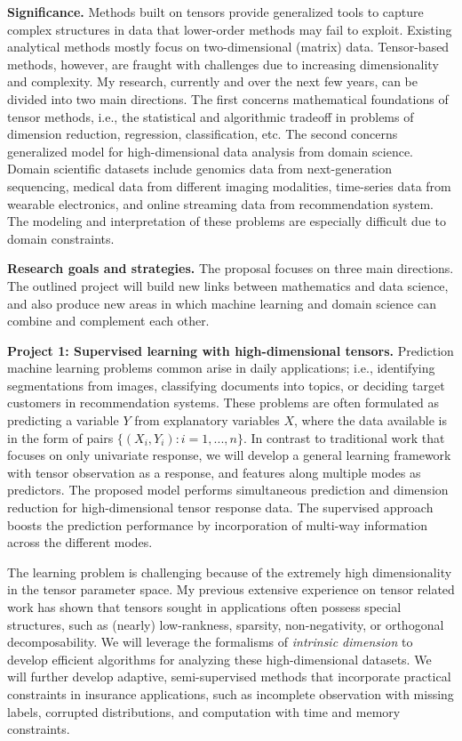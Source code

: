 \documentclass[11pt]{article}
\theoremstyle{plain}
\theoremstyle{definition}
\begin{document}
{\bf Significance.} Methods built on tensors provide generalized tools to capture complex structures in data that lower-order methods may fail to exploit. Existing analytical methods mostly focus on two-dimensional (matrix) data. Tensor-based methods, however, are fraught with challenges due to increasing dimensionality and complexity. My research, currently and over the next few years, can be divided into two main directions. The first concerns mathematical foundations of tensor methods, i.e., the statistical and algorithmic tradeoff in problems of dimension reduction, regression, classification, etc. The second concerns generalized model for high-dimensional data analysis from domain science. Domain scientific datasets include genomics data from next-generation sequencing, medical data from different imaging modalities, time-series data from wearable electronics, and online streaming data from recommendation system. The modeling and interpretation of these problems are especially difficult due to domain constraints. 

{\bf Research goals and strategies.} The proposal focuses on three main directions. The outlined project will build new links between mathematics and data science, and also produce new areas in which machine learning and domain science can combine and complement each other.

{\bf Project 1: Supervised learning with high-dimensional tensors.} Prediction machine learning problems common arise in daily applications; i.e., identifying segmentations from images, classifying documents into topics, or deciding target customers in recommendation systems. These problems are often formulated as predicting a variable $Y$ from explanatory variables $X$, where the data available is in the form of pairs $\{(X_i , Y_i)\colon i = 1, . . . , n\}$. In contrast to traditional work that focuses on only univariate response, we will develop a general learning framework with tensor observation as a response, and features along multiple modes as predictors. The proposed model performs simultaneous prediction and dimension reduction for high-dimensional tensor response data. The supervised approach boosts the prediction performance by incorporation of multi-way information across the different modes.

The learning problem is challenging because of the extremely high dimensionality in the tensor parameter space. My previous extensive experience on tensor related work has shown that tensors sought in applications often possess special structures, such as (nearly) low-rankness, sparsity, non-negativity, or orthogonal decomposability. We will leverage the formalisms of \emph{intrinsic dimension} to develop efficient algorithms for analyzing these high-dimensional datasets. We will further develop adaptive, semi-supervised methods that incorporate practical constraints in insurance applications, such as incomplete observation with missing labels, corrupted distributions, and computation with time and memory constraints.
\end{document}
